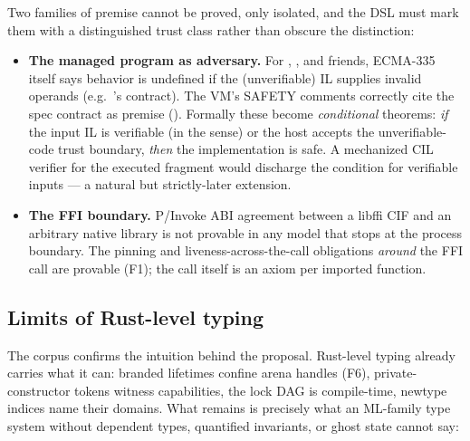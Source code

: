 Two families of premise cannot be proved, only isolated, and the DSL
must mark them with a distinguished trust class rather than obscure
the distinction:

\begin{itemize}[leftmargin=1.4em]
\item \textbf{The managed program as adversary.} For ,
  ,  and friends, ECMA-335 itself says
  behavior is undefined if the (unverifiable) IL supplies invalid
  operands (e.g.\ 's  contract). The VM's SAFETY
  comments correctly cite the spec contract as premise
  (). Formally these become
  \emph{conditional} theorems: \emph{if} the input IL is verifiable (in
  the  sense) or the host accepts the unverifiable-code
  trust boundary, \emph{then} the implementation is safe. A mechanized
  CIL verifier for the executed fragment would discharge the condition
  for verifiable inputs --- a natural but strictly-later extension.
\item \textbf{The FFI boundary.} P/Invoke ABI agreement between a
  libffi CIF and an arbitrary native library is not provable in any
  model that stops at the process boundary. The pinning and
  liveness-across-the-call obligations \emph{around} the FFI call are
  provable (F1); the call itself is an axiom per imported function.
\end{itemize}

\subsection{Limits of Rust-level typing}
\label{sec:obligations-whyrust}

The corpus confirms the intuition behind the proposal. Rust-level
typing already carries what it can: branded lifetimes confine arena
handles
(F6), private-constructor tokens witness capabilities, the lock DAG is
compile-time, newtype indices name their domains. What remains is
precisely what an ML-family type system without dependent types,
quantified invariants, or ghost state cannot say:

